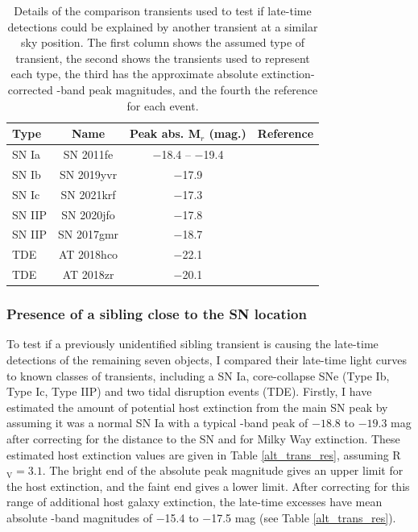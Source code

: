 \documentclass[a4paper,oneside,12pt, class=Latex/Classes/PhDthesisPSnPDF, crop=false]{standalone}
\begin{document}
\begin{table}
 \centering
 \caption{
 Details of the comparison transients used to test if late-time detections could be explained by another transient at a similar sky position. The first column shows the assumed type of transient, the second shows the transients used to represent each type, the third has the approximate absolute extinction-corrected \ztfr-band peak magnitudes, and the fourth the reference for each event.}
 \begin{tabular}{lccc}
  \hline
   Type & Name & Peak abs. M$_{r}$ (mag.) & Reference\\
   \hline
   SN Ia & SN 2011fe & $-$18.4 -- $-$19.4 & \citet{spec_HST}\\
   SN Ib & SN 2019yvr & $-$17.9 & \citet{Ib_ex}\\
   SN Ic & SN 2021krf & $-$17.3 & \citet{21krf_ext}\\
   SN IIP & SN 2020jfo & $-$17.8 & \citet{IIp_ext}\\
   SN IIP & SN 2017gmr & $-$18.7 & \citet{2017gmr}\\
   TDE & AT 2018hco & $-$22.1 & \citet{TDE_ext}\\
   TDE & AT 2018zr & $-$20.1 & \citet{TDE_ext}\\
   \hline
 \end{tabular}
 \label{alt_trans}
\end{table} 

\subsubsection{Presence of a sibling close to the SN location}
To test if a previously unidentified sibling transient is causing the late-time detections of the remaining seven objects, I compared their late-time light curves to known classes of transients, including a SN Ia, core-collapse SNe (Type Ib, Type Ic, Type IIP) and two tidal disruption events (TDE). Firstly, I have estimated the amount of potential host extinction from the main SN peak by assuming it was a normal SN Ia with a typical \ztfg-band peak of $-18.8$ to $-19.3$ mag after correcting for the distance to the SN and for Milky Way extinction. These estimated host extinction values are given in Table \ref{alt_trans_res}, assuming R$_\text{V} = 3.1$. The bright end of the absolute peak magnitude gives an upper limit for the host extinction, and the faint end gives a lower limit. After correcting for this range of additional host galaxy extinction, the late-time excesses have mean absolute \ztfr-band magnitudes of $-$15.4 to $-$17.5 mag (see Table \ref{alt_trans_res}). 
\end{document}
